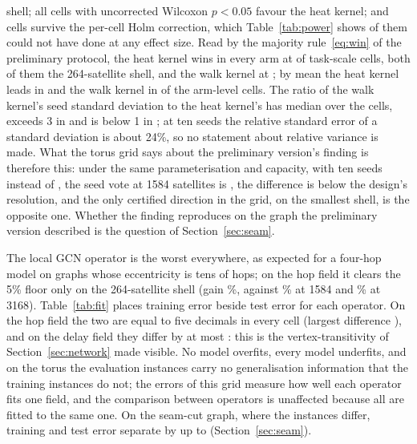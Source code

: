 \documentclass[preprint,11pt,3p]{elsarticle}
\begin{document}
shell; all \numGthreeSigRaw{} cells with uncorrected Wilcoxon $p<0.05$ favour the heat kernel;
and \numGthreeSigHolm{} cells survive the per-cell Holm correction, which Table~\ref{tab:power}
shows \numPowerCannotReject{} of them could not have done at any effect size. Read by the
majority rule~\eqref{eq:win} of the preliminary protocol, the heat kernel wins in every arm at
\numGthreeHeatRobust{} of \numGthreeCells{} task-scale cells, both of them the 264-satellite
shell, and the walk kernel at \numGthreeWalkRobust{}; by mean the heat kernel leads in
\numGthreeLeadHeat{} and the walk kernel in \numGthreeLeadWalk{} of the \numGthreeArmCells{}
arm-level cells. The ratio of the walk kernel's seed standard deviation to the heat kernel's has
median \numSdRatioMedian{} over the \numSdRatioCells{} cells, exceeds 3 in \numSdRatioGeThree{}
and is below 1 in \numSdRatioLtOne{}; at ten seeds the relative standard error of a standard
deviation is about 24\%, so no statement about relative variance is made. What the torus grid says about the
preliminary version's finding is therefore this: under the same parameterisation and capacity,
with ten seeds instead of \numPrelimSeeds{}, the seed vote at 1584 satellites is
\numPooledHopsShellOneWins{}, the difference is below the design's resolution, and the only
certified direction in the grid, on the smallest shell, is the opposite one. Whether the finding
reproduces on the graph the preliminary version described is the question of
Section~\ref{sec:seam}.

The local GCN operator is the worst everywhere, as expected for a four-hop model on graphs whose
eccentricity is tens of hops; on the hop field it clears the 5\% floor only on the 264-satellite
shell (gain \numGthreeGcnGainSmall\%, against \numGthreeGcnGainShellOne\% at 1584 and
\numGthreeGcnGainDouble\% at 3168). Table~\ref{tab:fit} places training error beside test error
for each operator. On the hop field the two are equal to five decimals in every cell (largest
difference \numFitMaxGapHops), and on the delay field they differ by at most \numFitMaxGap{}: this
is the vertex-transitivity of Section~\ref{sec:network} made visible. No model overfits, every
model underfits, and on the torus the evaluation instances carry no generalisation information
that the training instances do not; the errors of this grid measure how well each operator fits
one field, and the comparison between operators is unaffected because all are fitted to the
same one. On the seam-cut graph, where the instances differ, training and test error separate
by up to \numSeamFitMaxGap{} (Section~\ref{sec:seam}).
\end{document}
